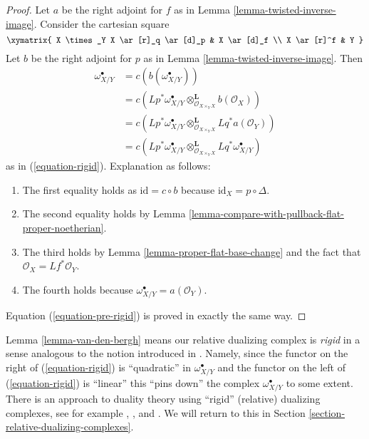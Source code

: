 \begin{proof}
Let $a$ be the right adjoint for $f$ as in
Lemma \ref{lemma-twisted-inverse-image}.
Consider the cartesian square
$$
\xymatrix{
X \times_Y X \ar[r]_q \ar[d]_p & X \ar[d]_f \\
X \ar[r]^f & Y
}
$$
Let $b$ be the right adjoint for $p$
as in Lemma \ref{lemma-twisted-inverse-image}. Then
\begin{align*}
\omega_{X/Y}^\bullet
& =
c(b(\omega_{X/Y}^\bullet)) \\
& =
c(Lp^*\omega_{X/Y}^\bullet
\otimes_{\mathcal{O}_{X \times_Y X}}^\mathbf{L} b(\mathcal{O}_X)) \\
& =
c(Lp^*\omega_{X/Y}^\bullet
\otimes_{\mathcal{O}_{X \times_Y X}}^\mathbf{L}
Lq^*a(\mathcal{O}_Y)) \\
& =
c(Lp^*\omega_{X/Y}^\bullet
\otimes_{\mathcal{O}_{X \times_Y X}}^\mathbf{L}
Lq^*\omega_{X/Y}^\bullet)
\end{align*}
as in (\ref{equation-rigid}). Explanation as follows:
\begin{enumerate}
\item The first equality holds as $\text{id} = c \circ b$ because
$\text{id}_X = p \circ \Delta$.
\item The second equality holds by
Lemma \ref{lemma-compare-with-pullback-flat-proper-noetherian}.
\item The third holds by Lemma \ref{lemma-proper-flat-base-change}
and the fact that $\mathcal{O}_X = Lf^*\mathcal{O}_Y$.
\item The fourth holds because $\omega_{X/Y}^\bullet = a(\mathcal{O}_Y)$.
\end{enumerate}
Equation (\ref{equation-pre-rigid}) is proved in exactly the same way.
\end{proof}

\begin{remark}
\label{remark-van-den-bergh}
Lemma \ref{lemma-van-den-bergh} means our relative dualizing
complex is {\it rigid} in a sense analogous to the notion introduced
in \cite{vdB-rigid}. Namely, since the functor on the right of
(\ref{equation-rigid})
is ``quadratic'' in $\omega_{X/Y}^\bullet$ and the functor on the left
of (\ref{equation-rigid})
is ``linear'' this ``pins down'' the complex $\omega_{X/Y}^\bullet$
to some extent. There is an approach to duality theory using
``rigid'' (relative) dualizing complexes, see for example
\cite{Neeman-rigid}, \cite{Yekutieli-rigid}, and \cite{Yekutieli-Zhang}.
We will return to this in Section \ref{section-relative-dualizing-complexes}.
\end{remark}



